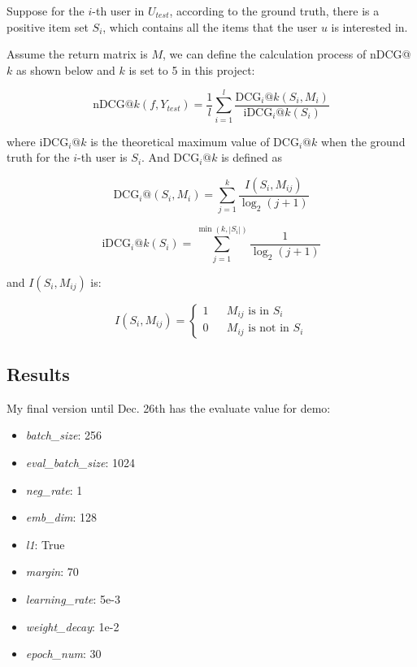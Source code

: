 \documentclass[lettersize,journal]{IEEEtran}
\begin{document}
Suppose for the $i$-th user in $U_{test}$, according to the ground truth, there is a positive item set $S_i$, which contains all the items that the user $u$ is interested in.

Assume the return matrix is $M$, we can define the calculation process of nDCG@$k$ as shown below and $k$ is set to 5 in this project:

$$
\text{nDCG@}k(f, Y_{test})=
\frac{1}{l} \sum\limits_{i=1}^{l}
\frac{\text{DCG}_i\text{@}k(S_i,M_ i)}
{\text{iDCG}_i\text{@}k(S_i)}
$$

where $\text{iDCG}_i\text{@}k$ is the theoretical maximum value of $\text{DCG}_i\text{@}k$ when the ground truth for the $i$-th user is $S_i$. And $\text{DCG}_i\text{@}k$ is defined as

$$
\text{DCG}_i\text{@}(S_i, M_i)=
\sum\limits_{j=1}^{k}
\frac{I(S_i,M_{ij})}
{\log_2(j+1)}
$$

$$
\text{iDCG}_i\text{@}k(S_i)=
\sum\limits_{j=1}^{\min{(k,|S_i|)}}
\frac{1}
{\log_2(j+1)}
$$

and $I(S_i, M_{ij})$ is:

$$
I(S_i,M_{ij})=
\left\{
    \begin{aligned}
        1 && \text{$M_{ij}$ is in $S_i$}\\
        0 && \text{$M_{ij}$ is not in $S_i$}
    \end{aligned}
\right.
$$

\subsection{Results}

My final version until Dec. 26th has the evaluate value for demo:

\begin{itemize}
    \item \textit{batch\_size}: 256
    \item \textit{eval\_batch\_size}: 1024
    \item \textit{neg\_rate}: 1
    \item \textit{emb\_dim}: 128
    \item \textit{l1}: True
    \item \textit{margin}: 70
    \item \textit{learning\_rate}: 5e-3
    \item \textit{weight\_decay}: 1e-2
    \item \textit{epoch\_num}: 30
\end{itemize}
\end{document}
